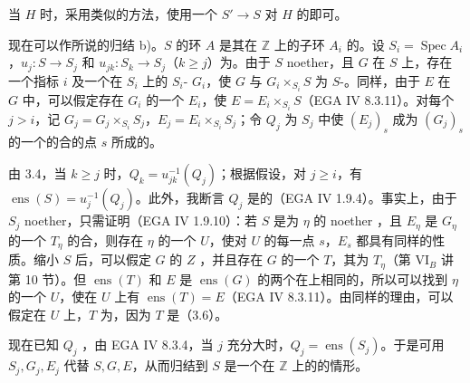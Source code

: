 当 $H$ 时，采用类似的方法，使用一个 $S'\to S$ 对 $H$ 的即可。

现在可以作所说的归结 b)。$S$ 的环 $A$ 是其在 $\mathbb Z$ 上的子环 $A_i$ 的。设 $S_i=\operatorname{Spec}A_i$，$u_j:S\to S_j$ 和 $u_{jk}:S_k\to S_j$（$k\ge j$）为。由于 $S$ noether，且 $G$ 在 $S$ 上，存在一个指标 $i$ 及一个在 $S_i$ 上的 $S_i$- $G_i$，使 $G$ 与 $G_i\times_{S_i}S$ 为 $S$-。同样，由于 $E$ 在 $G$ 中，可以假定存在 $G_i$ 的一个 $E_i$，使 $E=E_i\times_{S_i}S$（EGA IV 8.3.11）。对每个 $j>i$，记 $G_j=G_j\times_{S_i}S_j$，$E_j=E_i\times_{S_i}S_j$；令 $Q_j$ 为 $S_j$ 中使 $(E_j)_s$ 成为 $(G_j)_s$ 的一个的合的点 $s$ 所成的。

由 3.4，当 $k\ge j$ 时，$Q_k=u_{jk}^{-1}(Q_j)$；根据假设，对 $j\ge i$，有 $\operatorname{ens}(S)=u_j^{-1}(Q_j)$。此外，我断言 $Q_j$ 是的（EGA IV 1.9.4）。事实上，由于 $S_j$ noether，只需证明（EGA IV 1.9.10）：若 $S$ 是为 $\eta$ 的 noether ，且 $E_\eta$ 是 $G_\eta$ 的一个 $T_\eta$ 的合，则存在 $\eta$ 的一个 $U$，使对 $U$ 的每一点 $s$，$E_s$ 都具有同样的性质。缩小 $S$ 后，可以假定 $G$ 的 $Z$ ，并且存在 $G$ 的一个 $T$，其为 $T_\eta$（第 VI$_B$ 讲第 10 节）。但 $\operatorname{ens}(T)$ 和 $E$ 是 $\operatorname{ens}(G)$ 的两个在上相同的，所以可以找到 $\eta$ 的一个 $U$，使在 $U$ 上有 $\operatorname{ens}(T)=E$（EGA IV 8.3.11）。由同样的理由，可以假定在 $U$ 上，$T$ 为，因为 $T$ 是（3.6）。

现在已知 $Q_j$ ，由 EGA IV 8.3.4，当 $j$ 充分大时，$Q_j=\operatorname{ens}(S_j)$。于是可用 $S_j,G_j,E_j$ 代替 $S,G,E$，从而归结到 $S$ 是一个在 $\mathbb Z$ 上的的情形。

